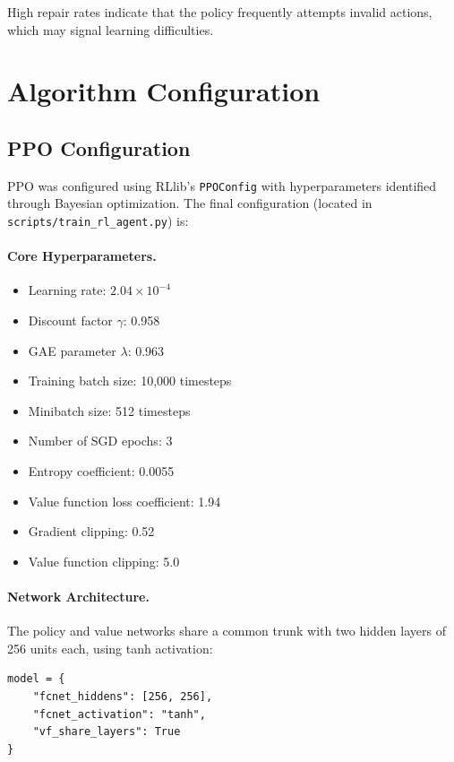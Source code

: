 \documentclass[english,bachelor]{hsluthesis}
\begin{document}
High repair rates indicate that the policy frequently attempts invalid actions, which may signal learning difficulties.

\section{Algorithm Configuration}

\subsection{PPO Configuration}

PPO was configured using RLlib's \texttt{PPOConfig} with hyperparameters identified through Bayesian optimization. The final configuration (located in \texttt{scripts/train\_rl\_agent.py}) is:

\paragraph{Core Hyperparameters.}
\begin{itemize}
    \item Learning rate: $2.04 \times 10^{-4}$
    \item Discount factor $\gamma$: 0.958
    \item GAE parameter $\lambda$: 0.963
    \item Training batch size: 10,000 timesteps
    \item Minibatch size: 512 timesteps
    \item Number of SGD epochs: 3
    \item Entropy coefficient: 0.0055
    \item Value function loss coefficient: 1.94
    \item Gradient clipping: 0.52
    \item Value function clipping: 5.0
\end{itemize}

\paragraph{Network Architecture.}
The policy and value networks share a common trunk with two hidden layers of 256 units each, using tanh activation:

\begin{verbatim}
model = {
    "fcnet_hiddens": [256, 256],
    "fcnet_activation": "tanh",
    "vf_share_layers": True
}
\end{verbatim}
\end{document}
